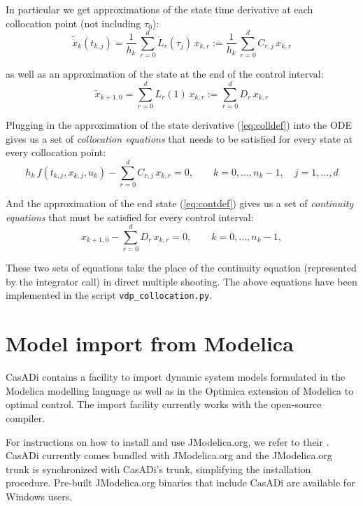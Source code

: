 \documentclass[a4paper,12pt]{book}
\begin{document}
{In particular we get approximations of the state time derivative at each collocation point (not including $\tau_0$):
\begin{equation}
\tilde{\dot{x}}_k(t_{k,j}) = \frac{1}{h_k} \, \sum_{r=0}^{d}{\dot{L}_r(\tau_j) \, x_{k,r}} := \frac{1}{h_k} \, \sum_{r=0}^{d}{C_{r,j} \, x_{k,r}}
\label{eq:colldef}
\end{equation}

as well as an approximation of the state at the end of the control interval:
\begin{equation}
\tilde{x}_{k+1,0} = \sum_{r=0}^{d}{L_r(1) \, x_{k,r}} := \sum_{r=0}^{d}{D_r \, x_{k,r}}
\label{eq:contdef}
\end{equation}

Plugging in the approximation of the state derivative (\ref{eq:colldef}) into the ODE gives us a set of \emph{collocation equations} that needs to be satisfied for every state at every collocation point:
\begin{equation}
h_k \, f(t_{k,j},x_{k,j},u_k) - \sum_{r=0}^{d}{C_{r,j} \, x_{k,r}} = 0, \qquad k=0,\ldots,n_k-1, \quad j=1,\ldots,d
\end{equation}

And the approximation of the end state (\ref{eq:contdef}) gives us a set of \emph{continuity equations} that must be satisfied for every control interval:
\begin{equation}
x_{k+1,0} - \sum_{r=0}^{d}{D_r \, x_{k,r}} = 0, \qquad k=0,\ldots,n_k-1, 
\end{equation}

These two sets of equations take the place of the continuity equation (represented by the integrator call) in direct multiple shooting. The above equations have been implemented in the script \texttt{vdp\_collocation.py}.

\chapter{Model import from Modelica}\label{sec:modelica}
CasADi contains a facility to import dynamic system models formulated in the Modelica modelling language as well as in the Optimica extension of Modelica to optimal control. The import facility currently works with the open-source  compiler.

For instructions on how to install and use JModelica.org, we refer to their . CasADi currently comes bundled with JModelica.org and the JModelica.org trunk is synchronized with CasADi's trunk, simplifying the installation procedure. Pre-built JModelica.org binaries that include CasADi are available for Windows users.

}
\end{document}
